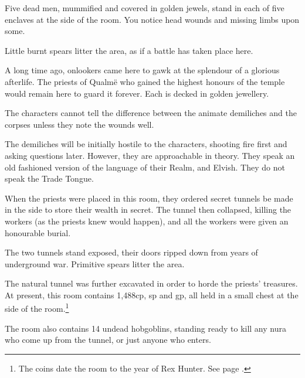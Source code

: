 \begin{multicols}{2}

\begin{boxtext}

	Five dead men, mummified and covered in golden jewels, stand in each of five enclaves at the side of the room.
	You notice head wounds and missing limbs upon some.

	Little burnt spears litter the area, as if a battle has taken place here.

\end{boxtext}

A long time ago, onlookers came here to gawk at the splendour of a glorious afterlife.  The priests of Qualm\"{e} who gained the highest honours of the temple would remain here to guard it forever.  Each is decked in golden jewellery.


The characters cannot tell the difference between the animate demiliches and the corpses unless they note the wounds well.

The demiliches will be initially hostile to the characters, shooting fire first and asking questions later.  However, they are approachable in theory.  They speak an old fashioned version of the language of their Realm, and Elvish.  They do not speak the Trade Tongue.


\begin{exampletext}

When the priests were placed in this room, they ordered secret tunnels be made in the side to store their wealth in secret.
The tunnel then collapsed, killing the workers (as the priests knew would happen), and all the workers were given an honourable burial.

\end{exampletext}

The two tunnels stand exposed, their doors ripped down from years of underground war.  Primitive spears litter the area.


The natural tunnel was further excavated in order to horde the priests' treasures.
At present, this room contains 1,488cp, \thepage sp and  gp, all held in a small chest at the side of the room.\footnote{The coins date the room to the year of Rex Hunter.
See page \pageref{r_hunter}.}

The room also contains 14 undead hobgoblins, standing ready to kill any nura who come up from the tunnel, or just anyone who enters.


\end{multicols}
